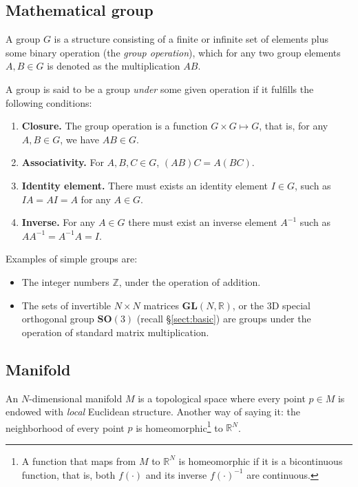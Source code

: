 \documentclass[a4paper,11pt]{report}
\begin{document}
\subsection{Mathematical group}
\label{sect:defs:group}

A group $G$ is a structure consisting of a
finite or infinite set of elements plus
some binary operation (the \emph{group operation}),
which for any two group elements $A,B \in G$
is denoted as the multiplication $A B$.

A group is said to be a group \emph{under} some given operation if
it fulfills the following conditions:
\begin{enumerate}
 \item \textbf{Closure.} The group operation is a function $G \times G \mapsto G$,
that is, for any $A,B \in G$, we have $A B \in G$.
 \item \textbf{Associativity.} For $A,B,C \in G$, $(AB)C = A(BC)$.
 \item \textbf{Identity element.} There must exists an identity element $I \in G$,
such as $IA=AI=A$ for any $A \in G$.
 \item \textbf{Inverse.} For any $A \in G$ there must exist an inverse element $A^{-1}$
such as $A A^{-1} = A^{-1} A = I$.
\end{enumerate}


Examples of simple groups are:
\begin{itemize}
 \item The integer numbers $\mathbb{Z}$, under the operation of addition.
 \item The sets of invertible $N \times N$ matrices $\mathbf{GL}(N,\mathbb{R})$,
or the 3D special orthogonal group $\mathbf{SO}(3)$ (recall \S\ref{sect:basic}) are groups
under the operation of standard matrix multiplication.
\end{itemize}


\subsection{Manifold}

An $N$-dimensional manifold $M$ is a topological space where
every point $p \in M$ is endowed with \emph{local} Euclidean structure.
Another way of saying it: the neighborhood of every point $p$
is homeomorphic\footnote{A
function that maps from $M$ to $\mathbb{R}^N$ is homeomorphic if it is
a bicontinuous function, that is, both $f(\cdot)$ and its inverse $f(\cdot)^{-1}$
are continuous.} to $\mathbb{R}^N$.
\end{document}
